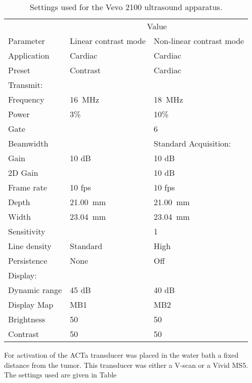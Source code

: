 \begin{table}[htb]
\label{tab:Vevo Ultrasound settings}
\caption{Settings used for the Vevo 2100 ultrasound apparatus.}
\begin{center}
\begin{tabular}{@{}l l l @{}}\toprule
& \multicolumn{2}{c}{Value} \\ \cmidrule(r){2-3}
Parameter & Linear contrast mode & Non-linear contrast mode\\
\midrule
Application & Cardiac & Cardiac\\
Preset & Contrast & Cardiac\\
Transmit:\\
Frequency & \SI{16}{\mega\hertz} & \SI{18}{\mega\hertz}\\
Power & 3\% & 10\%\\
Gate & & 6\\
Beamwidth & & Standard
Acquisition:\\
Gain & 10 dB & 10 dB\\
2D Gain & & 10 dB\\  
Frame rate & 10 fps & 10 fps\\
Depth & \SI{21.00}{\milli\meter} & \SI{21.00}{\milli\meter}\\
Width & \SI{23.04}{\milli\meter} & \SI{23.04}{\milli\meter}\\
Sensitivity & &1\\
Line density & Standard & High \\ 
Persistence & None & Off \\
Display:\\
Dynamic range &45 dB &40 dB \\
Display Map & MB1 & MB2\\
Brightness & 50 & 50\\
Contrast & 50 & 50 \\
  \bottomrule
\end{tabular}
\end{center}
\end{table}

For activation of the ACT\textregistered a transducer was placed in the water bath a fixed distance from the tumor. This transducer was either a V-scan or a Vivid MS5. The settings used are given in Table \

